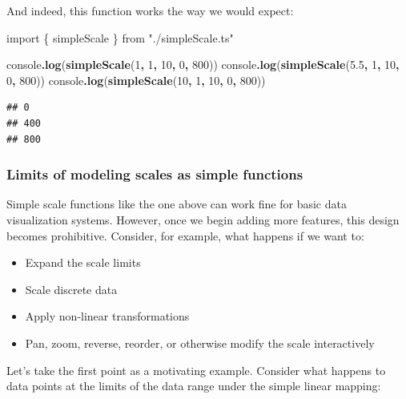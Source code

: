 \documentclass[
]{book}
\newenvironment{Shaded}{\begin{snugshade}}{\end{snugshade}}
\newcommand{\BuiltInTok}[1]{#1}
\newcommand{\DecValTok}[1]{\textcolor[rgb]{0.00,0.00,0.81}{#1}}
\newcommand{\FloatTok}[1]{\textcolor[rgb]{0.00,0.00,0.81}{#1}}
\newcommand{\FunctionTok}[1]{\textcolor[rgb]{0.13,0.29,0.53}{\textbf{#1}}}
\newcommand{\ImportTok}[1]{#1}
\newcommand{\NormalTok}[1]{#1}
\newcommand{\OperatorTok}[1]{\textcolor[rgb]{0.81,0.36,0.00}{\textbf{#1}}}
\newcommand{\StringTok}[1]{\textcolor[rgb]{0.31,0.60,0.02}{#1}}
\providecommand{\tightlist}{%
  \setlength{\itemsep}{0pt}\setlength{\parskip}{0pt}}
\theoremstyle{definition}
\theoremstyle{definition}
\theoremstyle{definition}
\theoremstyle{definition}
\theoremstyle{remark}
\begin{document}
And indeed, this function works the way we would expect:

\begin{Shaded}
\begin{Highlighting}[]
\ImportTok{import}\NormalTok{ \{ simpleScale \} }\ImportTok{from} \StringTok{"./simpleScale.ts"}

\BuiltInTok{console}\OperatorTok{.}\FunctionTok{log}\NormalTok{(}\FunctionTok{simpleScale}\NormalTok{(}\DecValTok{1}\OperatorTok{,} \DecValTok{1}\OperatorTok{,} \DecValTok{10}\OperatorTok{,} \DecValTok{0}\OperatorTok{,} \DecValTok{800}\NormalTok{))}
\BuiltInTok{console}\OperatorTok{.}\FunctionTok{log}\NormalTok{(}\FunctionTok{simpleScale}\NormalTok{(}\FloatTok{5.5}\OperatorTok{,} \DecValTok{1}\OperatorTok{,} \DecValTok{10}\OperatorTok{,} \DecValTok{0}\OperatorTok{,} \DecValTok{800}\NormalTok{))}
\BuiltInTok{console}\OperatorTok{.}\FunctionTok{log}\NormalTok{(}\FunctionTok{simpleScale}\NormalTok{(}\DecValTok{10}\OperatorTok{,} \DecValTok{1}\OperatorTok{,} \DecValTok{10}\OperatorTok{,} \DecValTok{0}\OperatorTok{,} \DecValTok{800}\NormalTok{))}
\end{Highlighting}
\end{Shaded}

\begin{verbatim}
## 0
## 400
## 800
\end{verbatim}

\subsubsection{Limits of modeling scales as simple functions}\label{simple-scale-limits}

Simple scale functions like the one above can work fine for basic data visualization systems. However, once we begin adding more features, this design becomes prohibitive. Consider, for example, what happens if we want to:

\begin{itemize}
\tightlist
\item
  Expand the scale limits
\item
  Scale discrete data
\item
  Apply non-linear transformations
\item
  Pan, zoom, reverse, reorder, or otherwise modify the scale interactively
\end{itemize}

Let's take the first point as a motivating example. Consider what happens to data points at the limits of the data range under the simple linear mapping:
\end{document}
